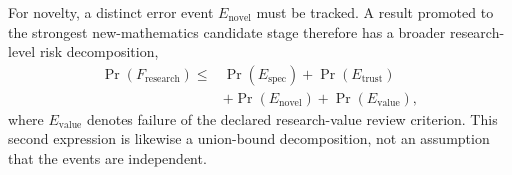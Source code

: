 For novelty, a distinct error event $E_{\mathrm{novel}}$ must be tracked. A result promoted to the strongest new-mathematics candidate stage therefore has a broader research-level risk decomposition,
\[
\begin{aligned}
\Pr(F_{\mathrm{research}})\leq{}&\Pr(E_{\mathrm{spec}})
+\Pr(E_{\mathrm{trust}})\\
&+\Pr(E_{\mathrm{novel}})
+\Pr(E_{\mathrm{value}}),
\end{aligned}
\]
where $E_{\mathrm{value}}$ denotes failure of the declared research-value review criterion. This second expression is likewise a union-bound decomposition, not an assumption that the events are independent.
